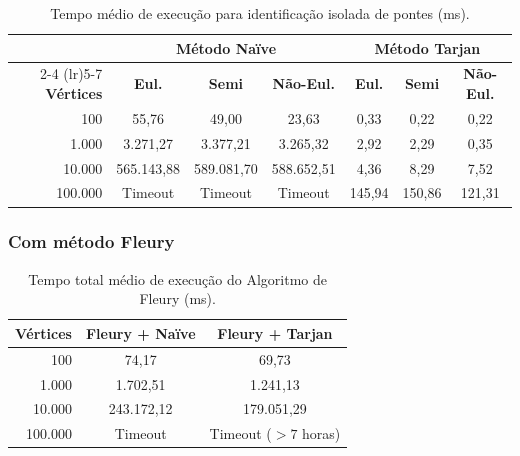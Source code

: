 \documentclass{sbc2023}%
\begin{document}
\begin{table}[H]
    \centering
    
    \caption{Tempo médio de execução para identificação isolada de pontes (ms).}
    \label{tab:pontes_isoladas}
    \small %
    \setlength{\tabcolsep}{4pt} %
    \begin{tabular}{@{}rcccccc@{}}
        \toprule
        & \multicolumn{3}{c}{\textbf{Método Naïve}} & \multicolumn{3}{c}{\textbf{Método Tarjan}} \\
        \cmidrule(lr){2-4} \cmidrule(lr){5-7}
        \textbf{Vértices} & \textbf{Eul.} & \textbf{Semi} & \textbf{Não-Eul.} & \textbf{Eul.} & \textbf{Semi} & \textbf{Não-Eul.} \\
        \midrule
        100     & 55,76      & 49,00      & 23,63      & 0,33   & 0,22   & 0,22 \\
        1.000   & 3.271,27   & 3.377,21   & 3.265,32   & 2,92   & 2,29   & 0,35 \\
        10.000  & 565.143,88 & 589.081,70 & 588.652,51 & 4,36   & 8,29   & 7,52 \\
        100.000 & Timeout    & Timeout    & Timeout    & 145,94 & 150,86 & 121,31 \\
        \bottomrule
    \end{tabular}
    
\end{table}

\subsubsection{Com método Fleury}
\begin{table}[H]
    \centering
    \caption{Tempo total médio de execução do Algoritmo de Fleury (ms).}
    \label{tab:fleury_integrado}
    \begin{tabular}{@{}rcc@{}}
        \toprule
        \textbf{Vértices} & \textbf{Fleury + Naïve} & \textbf{Fleury + Tarjan} \\
        \midrule
        100     & 74,17      & 69,73 \\
        1.000   & 1.702,51   & 1.241,13 \\
        10.000  & 243.172,12 & 179.051,29 \\
        100.000 & Timeout    & Timeout ($> 7$ horas) \\
        \bottomrule
    \end{tabular}
\end{table}
\end{document}
